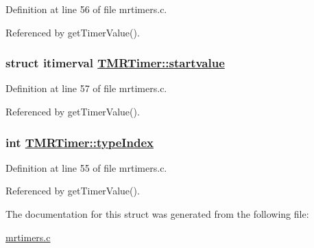 Definition at line 56 of file mrtimers.c.

Referenced by get\-Timer\-Value().\hypertarget{structTMRTimer_fab1ebdf9b11ae3bfd43feb3e598226b}{
\subsubsection[startvalue]{\setlength{\rightskip}{0pt plus 5cm}struct itimerval \hyperlink{structTMRTimer_fab1ebdf9b11ae3bfd43feb3e598226b}{TMRTimer::startvalue}}}
\label{structTMRTimer_fab1ebdf9b11ae3bfd43feb3e598226b}




Definition at line 57 of file mrtimers.c.

Referenced by get\-Timer\-Value().\hypertarget{structTMRTimer_09f50fe723b1b20ac76d41e7ccc925a5}{
\subsubsection[typeIndex]{\setlength{\rightskip}{0pt plus 5cm}int \hyperlink{structTMRTimer_09f50fe723b1b20ac76d41e7ccc925a5}{TMRTimer::type\-Index}}}
\label{structTMRTimer_09f50fe723b1b20ac76d41e7ccc925a5}




Definition at line 55 of file mrtimers.c.

Referenced by get\-Timer\-Value().

The documentation for this struct was generated from the following file:\begin{CompactItemize}
\item 
\hyperlink{mrtimers_8c}{mrtimers.c}\end{CompactItemize}

